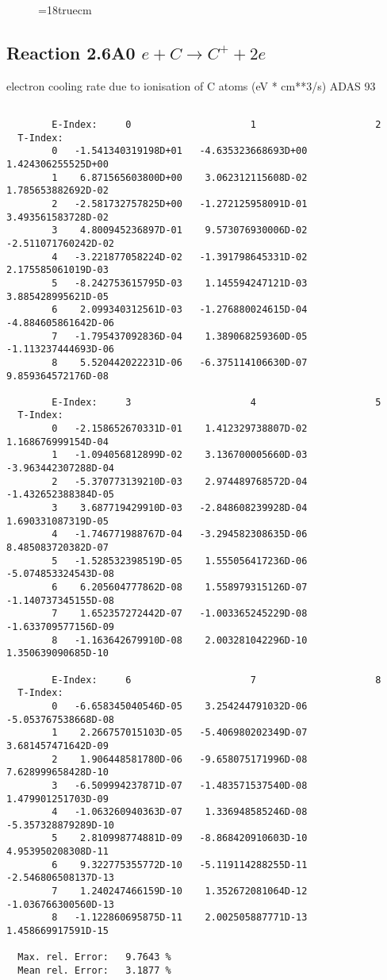 \begin{figure} \label{2.3.9aer}
\epsfxsize=18truecm
\end{figure}
\newpage

\subsection{
  Reaction 2.6A0  $e + C  \rightarrow C^+   + 2e $
}
electron cooling rate due to ionisation of C atoms (eV * cm**3/s)
ADAS 93

\begin{verbatim}

        E-Index:     0                     1                     2
  T-Index:
        0   -1.541340319198D+01   -4.635323668693D+00    1.424306255525D+00
        1    6.871565603800D+00    3.062312115608D-02    1.785653882692D-02
        2   -2.581732757825D+00   -1.272125958091D-01    3.493561583728D-02
        3    4.800945236897D-01    9.573076930006D-02   -2.511071760242D-02
        4   -3.221877058224D-02   -1.391798645331D-02    2.175585061019D-03
        5   -8.242753615795D-03    1.145594247121D-03    3.885428995621D-05
        6    2.099340312561D-03   -1.276880024615D-04   -4.884605861642D-06
        7   -1.795437092836D-04    1.389068259360D-05   -1.113237444693D-06
        8    5.520442022231D-06   -6.375114106630D-07    9.859364572176D-08

        E-Index:     3                     4                     5
  T-Index:
        0   -2.158652670331D-01    1.412329738807D-02    1.168676999154D-04
        1   -1.094056812899D-02    3.136700005660D-03   -3.963442307288D-04
        2   -5.370773139210D-03    2.974489768572D-04   -1.432652388384D-05
        3    3.687719429910D-03   -2.848608239928D-04    1.690331087319D-05
        4   -1.746771988767D-04   -3.294582308635D-06    8.485083720382D-07
        5   -1.528532398519D-05    1.555056417236D-06   -5.074853324543D-08
        6    6.205604777862D-08    1.558979315126D-07   -1.140737345155D-08
        7    1.652357272442D-07   -1.003365245229D-08   -1.633709577156D-09
        8   -1.163642679910D-08    2.003281042296D-10    1.350639090685D-10

        E-Index:     6                     7                     8
  T-Index:
        0   -6.658345040546D-05    3.254244791032D-06   -5.053767538668D-08
        1    2.266757015103D-05   -5.406980202349D-07    3.681457471642D-09
        2    1.906448581780D-06   -9.658075171996D-08    7.628999658428D-10
        3   -6.509994237871D-07   -1.483571537540D-08    1.479901251703D-09
        4   -1.063260940363D-07    1.336948585246D-08   -5.357328879289D-10
        5    2.810998774881D-09   -8.868420910603D-10    4.953950208308D-11
        6    9.322775355772D-10   -5.119114288255D-11   -2.546806508137D-13
        7    1.240247466159D-10    1.352672081064D-12   -1.036766300560D-13
        8   -1.122860695875D-11    2.002505887771D-13    1.458669917591D-15

  Max. rel. Error:   9.7643 %
  Mean rel. Error:   3.1877 %


\end{verbatim}

